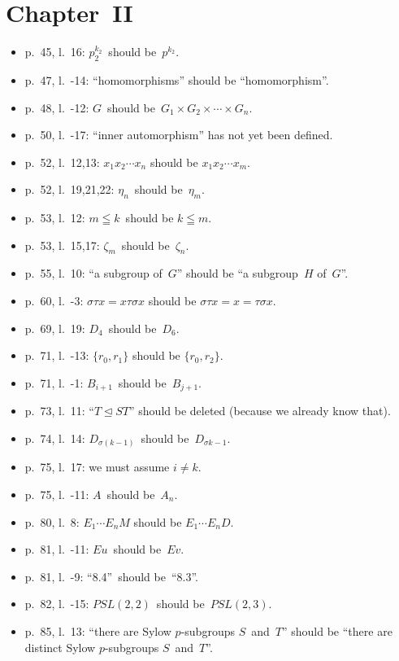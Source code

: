 \documentclass[letterpaper,12pt]{article}
\newcommand{\normal}{\trianglelefteq}
\begin{document}
\section*{Chapter~II}
\begin{itemize}
\item p.~45, l.~16: \(p_2^{k_2}\)~should be~\(p^{k_2}\).
\item p.~47, l.~-14: ``homomorphisms'' should be ``homomorphism''.
\item p.~48, l.~-12: \(G\)~should be~\(G_1\times G_2\times\cdots\times G_n\).
\item p.~50, l.~-17: ``inner automorphism'' has not yet been defined.
\item p.~52, l.~12,13: \(x_1x_2\cdots x_n\) should be \(x_1x_2\cdots x_m\).
\item p.~52, l.~19,21,22: \(\eta_n\)~should be~\(\eta_m\).
\item p.~53, l.~12: \(m\leqq k\)~should be \(k\leqq m\).
\item p.~53, l.~15,17: \(\zeta_m\)~should be~\(\zeta_n\).
\item p.~55, l.~10: ``a subgroup of~\(G\)'' should be ``a subgroup~\(H\) of~\(G\)''.
\item p.~60, l.~-3: \(\sigma\tau x=x\tau\sigma x\) should be \(\sigma\tau x=x=\tau\sigma x\).
\item p.~69, l.~19: \(D_4\)~should be~\(D_6\).
\item p.~71, l.~-13: \(\{r_0,r_1\}\) should be \(\{r_0,r_2\}\).
\item p.~71, l.~-1: \(B_{i+1}\)~should be~\(B_{j+1}\).
\item p.~73, l.~11: ``\(T\normal ST\)'' should be deleted (because we already know that).
\item p.~74, l.~14: \(D_{\sigma(k-1)}\)~should be~\(D_{\sigma k-1}\).
\item p.~75, l.~17: we must assume \(i\ne k\).
\item p.~75, l.~-11: \(A\)~should be~\(A_n\).
\item p.~80, l.~8: \(E_1\cdots E_nM\) should be \(E_1\cdots E_n D\).
\item p.~81, l.~-11: \(Eu\)~should be~\(Ev\).
\item p.~81, l.~-9: ``8.4''~should be~``8.3''.
\item p.~82, l.~-15: \(PSL(2,2)\)~should be~\(PSL(2,3)\).
\item p.~85, l.~13: ``there are Sylow \(p\)-subgroups \(S\)~and~\(T\)'' should be ``there are distinct Sylow \(p\)-subgroups \(S\)~and~\(T\)''.

\end{itemize}
\end{document}

